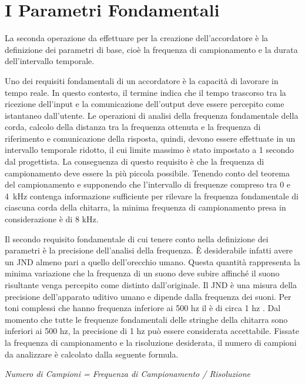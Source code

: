 \chapter*{I Parametri Fondamentali}\label{cap:parametri}

La seconda operazione da effettuare per la creazione dell'accordatore è la definizione dei parametri di base, cioè la frequenza di campionamento e la durata dell'intervallo temporale.  

Uno dei requisiti fondamentali di un accordatore è la capacità di lavorare in tempo reale. 
In questo contesto, il termine indica che il tempo trascorso tra la ricezione dell'input e la comunicazione dell'output deve essere percepito come istantaneo dall'utente. 
Le operazioni di analisi della frequenza fondamentale della corda, calcolo della distanza tra la frequenza ottenuta e la frequenza di riferimento e comunicazione della risposta, quindi, devono essere effettuate in un intervallo temporale ridotto, il cui limite massimo è stato impostato a 1 secondo dal progettista.
La conseguenza di questo requisito è che la frequenza di campionamento deve essere la più piccola possibile. 
Tenendo conto del teorema del campionamento e supponendo che l'intervallo di frequenze compreso tra 0 e \mbox{4 kHz} contenga informazione sufficiente per rilevare la frequenza fondamentale di ciascuna corda della chitarra, la minima frequenza di campionamento presa in considerazione è di 8 kHz.

Il secondo requisito fondamentale di cui tenere conto nella definizione dei parametri è la precisione dell'analisi della frequenza.
È desiderabile infatti avere un \mbox{JND} almeno pari a quello dell'orecchio umano. 
Questa quantità rappresenta la minima variazione che la frequenza di un suono deve subire affinché il suono risultante venga percepito come distinto dall'originale. 
Il \mbox{JND} è una misura della precisione dell'apparato uditivo umano e dipende dalla frequenza dei suoni.
Per toni complessi che hanno frequenza inferiore ai 500 hz il è di circa 1 hz . 
Dal momento che tutte le frequenze fondamentali delle stringhe della chitarra sono inferiori ai 500 hz, la precisione di 1 hz può essere considerata accettabile.
Fissate la frequenza di campionamento e la risoluzione desiderata, il numero di campioni da analizzare è calcolato dalla seguente formula.

\vspace{0.2cm}
\centerline{\textit{Numero di Campioni = Frequenza di Campionamento / Risoluzione}}
\vspace{0.2cm}


